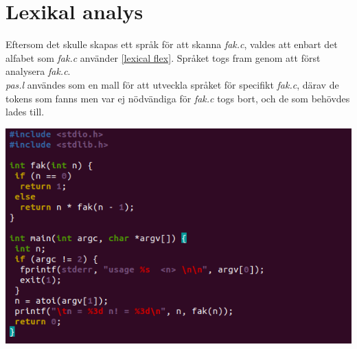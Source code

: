 \section{Lexikal analys}

Eftersom det skulle skapas ett språk för att skanna \textit{fak.c}, valdes att enbart det alfabet
som \textit{fak.c} använder \ref{lexical flex}. Språket togs fram genom att först analysera \textit{fak.c}.
\\ \textit{pas.l} användes som en mall för att utveckla språket för specifikt \textit{fak.c},
därav de tokens som fanns men var ej nödvändiga för \textit{fak.c} togs bort, och de som
behövdes lades till. 

\begin{center}
    \includegraphics[width=\linewidth]{bilder/fak_c.png}
    \label{fig:fak_c}
\end{center}

\newpage


